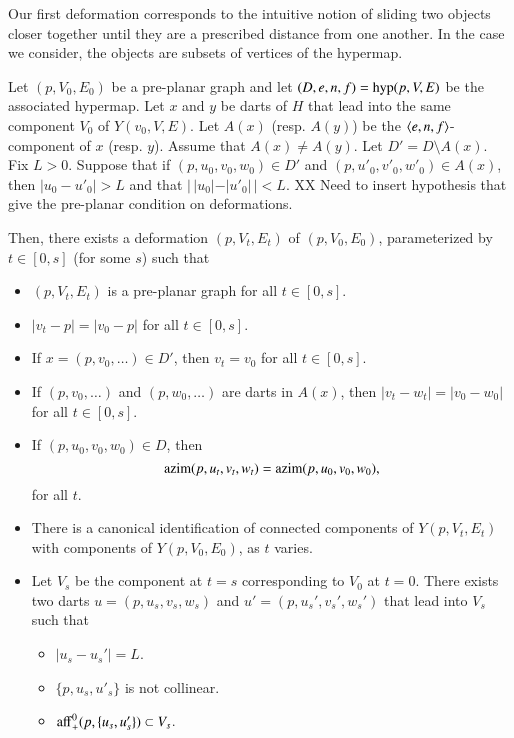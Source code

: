 Our first deformation corresponds to the intuitive
notion of sliding two objects closer together until
they are a prescribed distance from one another.
In the case we consider, the objects are subsets of
vertices of the hypermap.

\begin{lemma} Let $(p,V_0,E_0)$ be a pre-planar graph and
let $(D,e,n,f)={\operatorname{hyp}}(p,V,E)$ be the associated hypermap.
Let $x$ and $y$ be darts of $H$ that lead into the same
component $V_0$ of $Y(v_0,V,E)$.  Let $A(x)$ (resp. $A(y)$)
be the $\langle e,n,f\rangle$-component of $x$ (resp. $y$).
Assume that $A(x)\ne A(y)$.
Let $D' = D\setminus A(x)$.  
Fix $L>0$.
Suppose that if $(p,u_0,v_0,w_0)\in D'$ and
$(p,u'_0,v'_0,w'_0)\in A(x)$, then $|u_0-u'_0|>L$ and
that $|\,|u_0| - |u'_0|\,| < L$.
XX Need to insert hypothesis that give the pre-planar condition
on deformations.

Then, there exists a deformation
$(p,V_t,E_t)$ of $(p,V_0,E_0)$, parameterized by $t\in[0,s]$ (for some $s$) 
such
that
\begin{itemize}
\item $(p,V_t,E_t)$ is a pre-planar graph for all $t\in[0,s]$.
\item $|v_t-p| = |v_0-p|$ for all $t\in[0,s]$.
\item If $x=(p,v_0,\ldots)\in D'$, then $v_t=v_0$ for all $t\in[0,s]$.
\item If $(p,v_0,\ldots)$ and $(p,w_0,\ldots)$ are darts
in $A(x)$, then $|v_t-w_t|=|v_0-w_0|$ for all $t\in[0,s]$.
\item If $(p,u_0,v_0,w_0)\in D$, then 
   $$
   {\operatorname{azim}}(p,u_t,v_t,w_t) = {\operatorname{azim}}(p,u_0,v_0,w_0),
   $$
   for all $t$.
\item There is a canonical identification of connected components
of $Y(p,V_t,E_t)$ with components of $Y(p,V_0,E_0)$, as $t$ varies.
\item 
Let $V_s$ be the component at $t=s$ corresponding to $V_0$ at $t=0$.
There exists two darts $u=(p,u_s,v_s,w_s)$ and
$u'=(p,u_s',v_s',w_s')$ that lead into $V_s$ such that
  \begin{itemize} %
  \item $|u_s-u_s'| = L$.
  \item $\{p,u_s,u'_s\}$ is not collinear.
  \item ${\operatorname{aff}}_+^0(p,\{u_s,u_s'\}) \subset V_s$.
  \end{itemize} %
\end{itemize}
\end{lemma}

